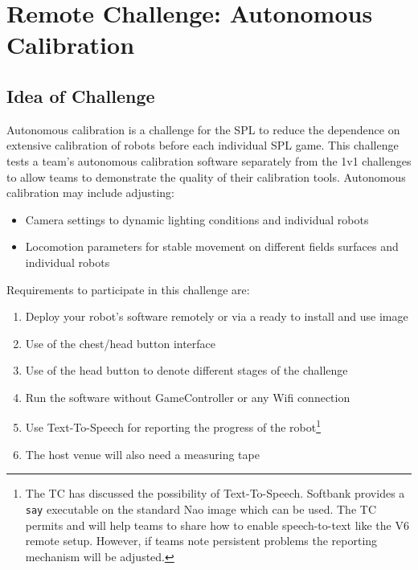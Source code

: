 \section{Remote Challenge: Autonomous Calibration}
\label{sec:AutonmousCalibration}

\subsection{Idea of Challenge}

Autonomous calibration is a challenge for the SPL to reduce the dependence on extensive calibration of robots before each individual SPL game.
This challenge tests a team's autonomous calibration software separately from the 1v1 challenges to allow teams to demonstrate the quality of their calibration tools.
Autonomous calibration may include adjusting:
\begin{itemize}
    \item Camera settings to dynamic lighting conditions and individual robots
    \item Locomotion parameters for stable movement on different fields surfaces and individual robots
\end{itemize}

Requirements to participate in this challenge are:
\begin{enumerate}
    \item Deploy your robot's software remotely or via a ready to install and use image
    \item Use of the chest/head button interface
    \item Use of the head button to denote different stages of the challenge
    \item Run the software without GameController or any Wifi connection
    \item Use Text-To-Speech for reporting the progress of the robot\footnote{The TC has discussed the possibility of Text-To-Speech. Softbank provides a \texttt{say} executable on the standard Nao image which can be used. The TC permits and will help teams to share how to enable speech-to-text like the V6 remote setup. However, if teams note persistent problems the reporting mechanism will be adjusted.}
    \item The host venue will also need a measuring tape
\end{enumerate}

